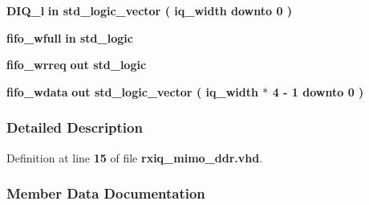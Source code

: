 \begin{DoxyCompactItemize}
{\bf D\+I\+Q\+\_\+l}  {\bfseries {\bfseries \textcolor{keywordflow}{in}\textcolor{vhdlchar}{ }}} {\bfseries \textcolor{comment}{std\+\_\+logic\+\_\+vector}\textcolor{vhdlchar}{ }\textcolor{vhdlchar}{(}\textcolor{vhdlchar}{ }\textcolor{vhdlchar}{ }\textcolor{vhdlchar}{ }\textcolor{vhdlchar}{ }{\bfseries {\bf iq\+\_\+width}} \textcolor{vhdlchar}{ }\textcolor{keywordflow}{downto}\textcolor{vhdlchar}{ }\textcolor{vhdlchar}{ } \textcolor{vhdldigit}{0} \textcolor{vhdlchar}{ }\textcolor{vhdlchar}{)}\textcolor{vhdlchar}{ }} 
\item 
{\bf fifo\+\_\+wfull}  {\bfseries {\bfseries \textcolor{keywordflow}{in}\textcolor{vhdlchar}{ }}} {\bfseries \textcolor{comment}{std\+\_\+logic}\textcolor{vhdlchar}{ }} 
\item 
{\bf fifo\+\_\+wrreq}  {\bfseries {\bfseries \textcolor{keywordflow}{out}\textcolor{vhdlchar}{ }}} {\bfseries \textcolor{comment}{std\+\_\+logic}\textcolor{vhdlchar}{ }} 
\item 
{\bf fifo\+\_\+wdata}  {\bfseries {\bfseries \textcolor{keywordflow}{out}\textcolor{vhdlchar}{ }}} {\bfseries \textcolor{comment}{std\+\_\+logic\+\_\+vector}\textcolor{vhdlchar}{ }\textcolor{vhdlchar}{(}\textcolor{vhdlchar}{ }\textcolor{vhdlchar}{ }\textcolor{vhdlchar}{ }\textcolor{vhdlchar}{ }{\bfseries {\bf iq\+\_\+width}} \textcolor{vhdlchar}{$\ast$}\textcolor{vhdlchar}{ } \textcolor{vhdldigit}{4} \textcolor{vhdlchar}{-\/}\textcolor{vhdlchar}{ } \textcolor{vhdldigit}{1} \textcolor{vhdlchar}{ }\textcolor{keywordflow}{downto}\textcolor{vhdlchar}{ }\textcolor{vhdlchar}{ } \textcolor{vhdldigit}{0} \textcolor{vhdlchar}{ }\textcolor{vhdlchar}{)}\textcolor{vhdlchar}{ }} 
\end{DoxyCompactItemize}


\subsubsection{Detailed Description}


Definition at line {\bf 15} of file {\bf rxiq\+\_\+mimo\+\_\+ddr.\+vhd}.



\subsubsection{Member Data Documentation}
